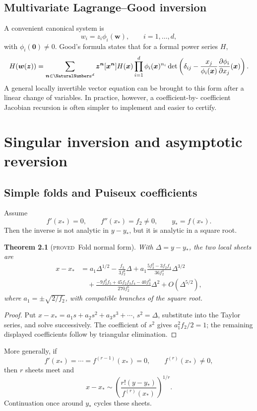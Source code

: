 \documentclass[11pt,letterpaper,oneside,openany]{book}
\newtheorem{theorem}{Theorem}[chapter]
\theoremstyle{definition}
\theoremstyle{remark}
\newcommand{\statusproved}{\textcolor{provedgreen}{\textsc{proved}}}
\begin{document}
\section{Multivariate Lagrange--Good inversion}
A convenient canonical system is
\[
 w_i=z_i\phi_i(\bm w),\qquad i=1,\ldots,d,
\]
with \(\phi_i(\bm0)\ne0\).  Good's formula \cite{Good1960} states that for a
formal power series \(H\),
\[
 H(\bm w(\bm z))
 =\sum_{\bm n\in\NaturalNumbers^d}\bm z^{\bm n}
 [\bm x^{\bm n}]
 H(\bm x)\prod_{i=1}^d\phi_i(\bm x)^{n_i}
 \det\left(\delta_{ij}-\frac{x_j}{\phi_i(\bm x)}
 \frac{\partial\phi_i}{\partial x_j}(\bm x)\right).
\]
A general locally invertible vector equation can be brought to this form after
a linear change of variables.  In practice, however, a coefficient-by-
coefficient Jacobian recursion is often simpler to implement and easier to
certify.

\chapter{Singular inversion and asymptotic reversion}

\section{Simple folds and Puiseux coefficients}
Assume
\[
 f'(x_*)=0,\qquad f''(x_*)=f_2\ne0,
 \qquad y_*=f(x_*).
\]
Then the inverse is not analytic in \(y-y_*\), but it is analytic in a square
root.

\begin{theorem}[\statusproved\ Fold normal form]
With \(\Delta=y-y_*\), the two local sheets are
\begin{align*}
 x-x_*
 &=a_1\Delta^{1/2}-\frac{f_3}{3f_2^2}\Delta
 +a_1\frac{5f_3^2-3f_2f_4}{36f_2^3}\Delta^{3/2}\\
 &\quad+
 \frac{-9f_2^2f_5+45f_2f_3f_4-40f_3^3}{270f_2^5}\Delta^2
 +O(\Delta^{5/2}),
\end{align*}
where \(a_1=\pm\sqrt{2/f_2}\), with compatible branches of the square root.
\end{theorem}
\begin{proof}
Put \(x-x_*=a_1s+a_2s^2+a_3s^3+\cdots\), \(s^2=\Delta\), substitute into
the Taylor series, and solve successively.  The coefficient of \(s^2\) gives
\(a_1^2f_2/2=1\); the remaining displayed coefficients follow by triangular
elimination.
\end{proof}

More generally, if
\[
 f'(x_*)=\cdots=f^{(r-1)}(x_*)=0,
 \qquad f^{(r)}(x_*)\ne0,
\]
then \(r\) sheets meet and
\[
 x-x_*\sim\left(\frac{r!(y-y_*)}{f^{(r)}(x_*)}\right)^{1/r}.
\]
Continuation once around \(y_*\) cycles these sheets.
\end{document}
